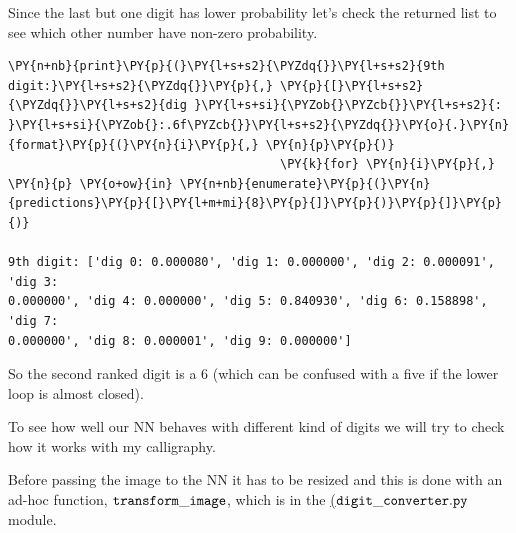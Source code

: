 Since the last but one digit has lower probability let's check the
returned list to see which other number have non-zero probability.

\begin{tcolorbox}[breakable, size=fbox, boxrule=1pt, pad at break*=1mm,colback=cellbackground, colframe=cellborder]
\begin{Verbatim}[commandchars=\\\{\}]
\PY{n+nb}{print}\PY{p}{(}\PY{l+s+s2}{\PYZdq{}}\PY{l+s+s2}{9th digit:}\PY{l+s+s2}{\PYZdq{}}\PY{p}{,} \PY{p}{[}\PY{l+s+s2}{\PYZdq{}}\PY{l+s+s2}{dig }\PY{l+s+si}{\PYZob{}\PYZcb{}}\PY{l+s+s2}{: }\PY{l+s+si}{\PYZob{}:.6f\PYZcb{}}\PY{l+s+s2}{\PYZdq{}}\PY{o}{.}\PY{n}{format}\PY{p}{(}\PY{n}{i}\PY{p}{,} \PY{n}{p}\PY{p}{)} 
                                      \PY{k}{for} \PY{n}{i}\PY{p}{,} \PY{n}{p} \PY{o+ow}{in} \PY{n+nb}{enumerate}\PY{p}{(}\PY{n}{predictions}\PY{p}{[}\PY{l+m+mi}{8}\PY{p}{]}\PY{p}{)}\PY{p}{]}\PY{p}{)}

9th digit: ['dig 0: 0.000080', 'dig 1: 0.000000', 'dig 2: 0.000091', 'dig 3:
0.000000', 'dig 4: 0.000000', 'dig 5: 0.840930', 'dig 6: 0.158898', 'dig 7:
0.000000', 'dig 8: 0.000001', 'dig 9: 0.000000']
\end{Verbatim}
\end{tcolorbox}

So the second ranked digit is a 6 (which can be confused with a five if
the lower loop is almost closed).

To see how well our NN behaves with different kind of digits we will try
to check how it works with my calligraphy.

Before passing the image to the NN it has to be resized and this is done
with an ad-hoc function, \(\tt{transform\_image}\), which is in the
 \href{https://drive.google.com/file/d/1FMYvOJDDOdIv7kDb2VIGhAkNNmReiOb_/view?usp=sharing}{(\(\tt{digit\_converter.py}\)} module.

